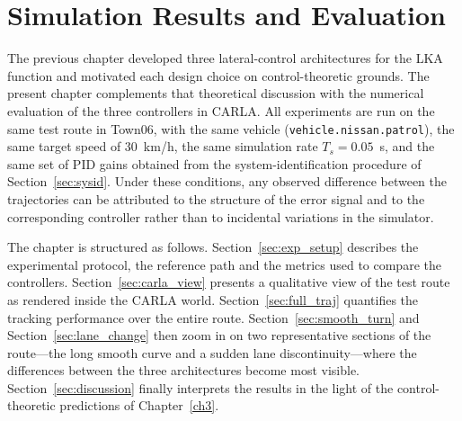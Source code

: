 %

\chapter{Simulation Results and Evaluation}
\label{ch4}

The previous chapter developed three lateral-control architectures for the \ac{LKA} function and motivated each design choice on control-theoretic grounds. The present chapter complements that theoretical discussion with the numerical evaluation of the three controllers in CARLA. All experiments are run on the same test route in Town06, with the same vehicle (\texttt{vehicle.nissan.patrol}), the same target speed of $30$~km/h, the same simulation rate $T_s = 0.05$~s, and the same set of PID gains obtained from the system-identification procedure of Section~\ref{sec:sysid}. Under these conditions, any observed difference between the trajectories can be attributed to the structure of the error signal and to the corresponding controller rather than to incidental variations in the simulator.

The chapter is structured as follows. Section~\ref{sec:exp_setup} describes the experimental protocol, the reference path and the metrics used to compare the controllers. Section~\ref{sec:carla_view} presents a qualitative view of the test route as rendered inside the CARLA world. Section~\ref{sec:full_traj} quantifies the tracking performance over the entire route. Section~\ref{sec:smooth_turn} and Section~\ref{sec:lane_change} then zoom in on two representative sections of the route---the long smooth curve and a sudden lane discontinuity---where the differences between the three architectures become most visible. Section~\ref{sec:discussion} finally interprets the results in the light of the control-theoretic predictions of Chapter~\ref{ch3}.

